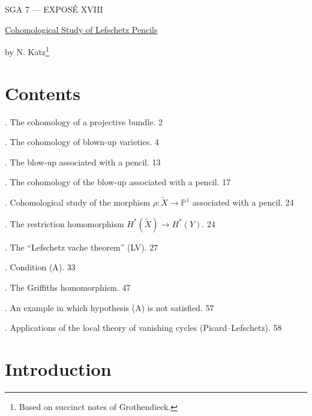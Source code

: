 \clearpage
\begin{center}
{\large SGA 7 --- EXPOS\'E XVIII}\par
\vspace{2em}
{\Large\underline{Cohomological Study of Lefschetz Pencils}}\par
\vspace{1.5em}
{\large by N. Katz\footnote{Based on succinct notes of Grothendieck.}}
\end{center}

\section*{Contents}

. The cohomology of a projective bundle. \hfill 2

. The cohomology of blown-up varieties. \hfill 4

. The blow-up associated with a pencil. \hfill 13

. The cohomology of the blow-up associated with a pencil. \hfill 17

. Cohomological study of the morphism
$\rho:\widetilde X\longrightarrow\mathbb P^1$ associated with a pencil.
\hfill 24

\noindent{}. The restriction homomorphism
$H^*(\widetilde X)\longrightarrow H^*(Y)$. \hfill 24

\noindent{}. The ``Lefschetz vache theorem'' (LV). \hfill 27

\noindent{}. Condition (A). \hfill 33

\noindent{}. The Griffiths homomorphism. \hfill 47

\noindent{}. An example in which hypothesis (A) is not satisfied.
\hfill 57

. Applications of the local theory of vanishing cycles
(Picard--Lefschetz). \hfill 58

\section*{Introduction}

